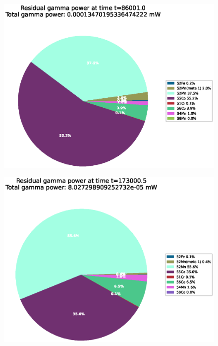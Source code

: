 \begin{figure}[!htb]
\centering
\includegraphics[width=0.8\linewidth]{chapters/activity_code/fe-activity-v2/residual-energy/0166_86001.eps}
\caption{}
\label{fig:activity-v2-residual-power-86001s}
\end{figure}

\begin{figure}[!htb]
\centering
\includegraphics[width=0.8\linewidth]{chapters/activity_code/fe-activity-v2/residual-energy/0233_173000.eps}
\caption{}
\label{fig:activity-v2-residual-power-173000s}
\end{figure}

